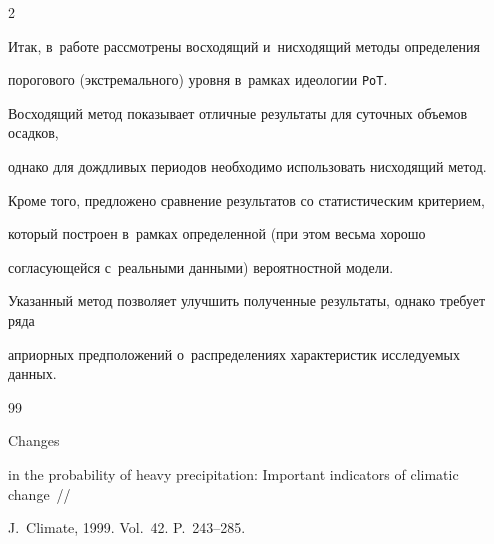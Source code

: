 \begin{multicols}{2}
\vspace*{-1pt}





Итак, в~работе рассмотрены восходящий и~нисходящий методы определения 


порогового (экстремального) уровня в~рамках идеологии \verb"PoT". 


Восходящий метод показывает отличные результаты для суточных объемов осадков, 


однако для дождливых периодов необходимо использовать нисходящий метод. 


Кроме того, предложено сравнение результатов со статистическим критерием, 


который построен в~рамках определенной (при этом весьма хорошо 


согласующейся с~реальными данными) вероятностной модели. 


Указанный метод позволяет улучшить полученные результаты, однако требует ряда 


априорных предположений о~распределениях характеристик исследуемых данных.





\vspace*{-6pt}





{\small\frenchspacing


 {%




 \begin{thebibliography}{99}


 




 




 Changes


in the probability of heavy precipitation: Important indicators of climatic change~// 


J.~Climate, 1999. Vol.~42. P.~243--285.








\end{thebibliography}}}
\end{multicols}

